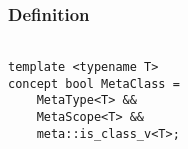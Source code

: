 
\subsubsection{Definition}

\begin{verbatim}

template <typename T>
concept bool MetaClass =
	MetaType<T> &&
	MetaScope<T> &&
	meta::is_class_v<T>;

\end{verbatim}
